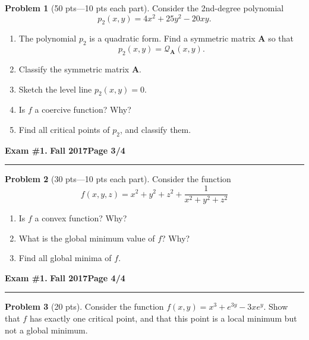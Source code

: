 \documentclass[12pt]{article}
\theoremstyle{definition}
\newtheorem{problem}{Problem}
\begin{document}
\bigskip
\begin{problem}[50 pts---10 pts each part]
Consider the 2nd-degree polynomial 
\begin{equation*}
p_2(x,y) = 4x^2 + 25y^2 - 20xy.
\end{equation*}
\begin{enumerate}
  \item The polynomial $p_2$ is a quadratic form.  Find a symmetric matrix $\boldsymbol{A}$ so that 
  \begin{equation*}
  p_2(x,y) = \mathcal{Q}_{\boldsymbol{A}}(x,y).
  \end{equation*}
  \vspace{1cm}
  \item Classify the symmetric matrix $\boldsymbol{A}$.
  \vspace{1.5cm}
  \item Sketch the level line $p_2(x,y) = 0$.  
  \begin{flushright}
  \end{flushright}
  \item Is $f$ a coercive function?  Why?
  \vspace{1cm}
  \item Find all critical points of $p_2$, and classify them.
\end{enumerate}
\end{problem}
\newpage


\hfill{\large\bf Exam \#1.}\hfill{\large\bf
  Fall 2017}\hfill{\large\bf Page 3/4}\hrule

\bigskip
\begin{problem}[30 pts---10 pts each part]
Consider the function
\begin{equation*}
f(x,y,z) = x^2+y^2+z^2 + \frac{1}{x^2+y^2+z^2}
\end{equation*}
\begin{enumerate}
  \item Is $f$ a convex function?  Why?
  \vspace{5cm}
  \item What is the global minimum value of $f$?  Why?
  \vspace{1cm}
  \item Find all global minima of $f$.
\end{enumerate}
\end{problem}
\newpage

\hfill{\large\bf Exam \#1.}\hfill{\large\bf
  Fall 2017}\hfill{\large\bf Page 4/4}\hrule

\bigskip
\begin{problem}[20 pts]
Consider the function $f(x,y)= x^3+e^{3y}-3xe^y$.  Show that $f$ has exactly one critical point, and that this point is a local minimum but not a global minimum.
\end{problem}
\end{document}
